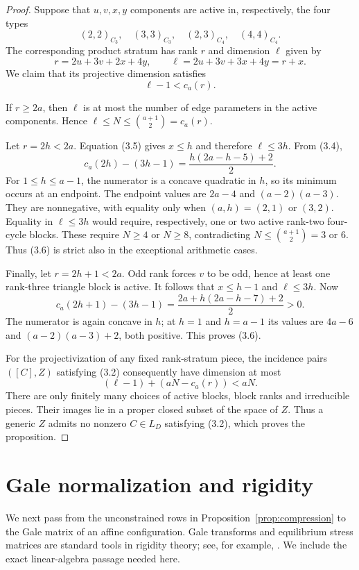 \documentclass[11pt]{article}
\begin{document}
\begin{proof}
Suppose that $u,v,x,y$ components are active in, respectively, the four
types
\[
 (2,2)_{C_3},\quad(3,3)_{C_3},\quad
 (2,3)_{C_4},\quad(4,4)_{C_4}.
\]
The corresponding product stratum has rank $r$ and dimension $\ell$ given
by
\[
 r=2u+3v+2x+4y,
 \qquad \ell=2u+3v+3x+4y=r+x.
 \tag{3.5}
\]
We claim that its projective dimension satisfies
\[
 \ell-1<c_a(r).
 \tag{3.6}
\]

If $r\geq2a$, then $\ell$ is at most the number of edge parameters in the
active components.  Hence
$\ell\leq N\leq\binom{a+1}{2}=c_a(r)$.

Let $r=2h<2a$.  Equation (3.5) gives $x\leq h$ and therefore
$\ell\leq3h$.  From (3.4),
\[
 c_a(2h)-(3h-1)=\frac{h(2a-h-5)+2}{2}.
 \tag{3.7}
\]
For $1\leq h\leq a-1$, the numerator is a concave quadratic in $h$, so
its minimum occurs at an endpoint.  The endpoint values are $2a-4$ and
$(a-2)(a-3)$.  They are nonnegative, with equality only when
$(a,h)=(2,1)$ or $(3,2)$.  Equality in $\ell\leq3h$ would require,
respectively, one or two active rank-two four-cycle blocks.  These require
$N\geq4$ or $N\geq8$, contradicting $N\leq\binom{a+1}{2}=3$ or $6$.
Thus (3.6) is strict also in the exceptional arithmetic cases.

Finally, let $r=2h+1<2a$.  Odd rank forces $v$ to be odd, hence at least
one rank-three triangle block is active.  It follows that $x\leq h-1$ and
$\ell\leq3h$.  Now
\[
 c_a(2h+1)-(3h-1)
 =\frac{2a+h(2a-h-7)+2}{2}>0.
 \tag{3.8}
\]
The numerator is again concave in $h$; at $h=1$ and $h=a-1$ its values are
$4a-6$ and $(a-2)(a-3)+2$, both positive.  This proves (3.6).

For the projectivization of any fixed rank-stratum piece, the incidence
pairs $([C],Z)$ satisfying (3.2) consequently have dimension at most
\[
 (\ell-1)+(aN-c_a(r))<aN.
\]
There are only finitely many choices of active blocks, block ranks and
irreducible pieces.  Their images lie in a proper closed subset of the space
of $Z$.  Thus a generic $Z$ admits no nonzero $C\in L_D$ satisfying (3.2),
which proves the proposition.
\end{proof}

\section{Gale normalization and rigidity}

We next pass from the unconstrained rows in
Proposition~\ref{prop:compression} to the Gale matrix of an affine
configuration.  Gale transforms and equilibrium stress matrices are standard
tools in rigidity theory; see, for example,
\cite{GortlerHealyThurston2010}.  We include the exact linear-algebra passage
needed here.
\end{document}
